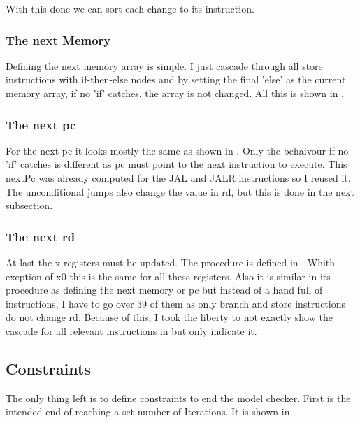 With this done we can sort each change to its instruction.



\subsubsection{The next Memory}
Defining the next memory array is simple. I just cascade through all
store instructions with if-then-else nodes and by setting the final
'else' as the current memory array, if no 'if' catches, the array is
not changed. All this is shown in .



\subsubsection{The next pc}
For the next pc it looks mostly the same as shown in
. Only the behaivour if no 'if' catches is
different as pc must point to the next instruction to execute. This
nextPc was already computed for the JAL and JALR instructions so I
reused it. The unconditional jumps also change the value in rd, but
this is done in the next subsection.



\subsubsection{The next rd}
At last the x registers must be updated. The procedure is defined in
. Whith exeption of x0 this is the same for all
these registers. Also it is similar in its procedure as defining the
next memory or pc but instead of a hand full of instructions, I have
to go over 39 of them as only branch and store instructions do not
change rd. Because of this, I took the liberty to not exactly show
the cascade for all relevant instructions in  but
only indicate it.



\subsection{Constraints}
The only thing left is to define constraints to end the model
checker. First is the intended end of reaching a set number of
Iterations. It is shown in .

